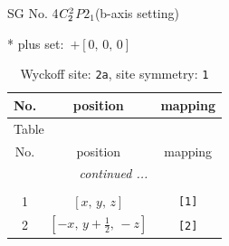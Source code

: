 \documentclass[fleqn,8pt]{jsarticle}
\begin{document}
\setcounter{MaxMatrixCols}{32}

\renewcommand{\tablename}{Table~}
\renewcommand{\figurename}{Figure~}
\begin{center}
\LARGE
SG No. 4\quad$C_{\rm 2}^{2}$\quad$P2_1$\quad(b-axis setting)\quad[ monoclinic ]
\end{center}
* plus set:\,\,\,$+\left[ 0,\, 0,\, 0 \right]$
\renewcommand{\arraystretch}{1.2}
\begin{longtable}{ccc}
\caption{Wyckoff site: {\tt 2a}, site symmetry: {\tt 1}}
 \\
 \hline \hline
No. & position & mapping \\ \hline \endfirsthead

\multicolumn{2}{l}{\tablename\ \thetable{}} \\
 \hline \hline
No. & position & mapping \\ \hline \endhead

 \hline \hline
\multicolumn{2}{r}{\footnotesize\it continued ...} \\ \endfoot

 \hline \hline
\multicolumn{2}{r}{} \\ \endlastfoot

1 & $\left[ x,\, y,\, z \right]$ & {\tt [1]} \\ \hline
2 & $\left[ - x,\, y + \frac{1}{2},\, - z \right]$ & {\tt [2]} \\
\end{longtable}
\end{document}
